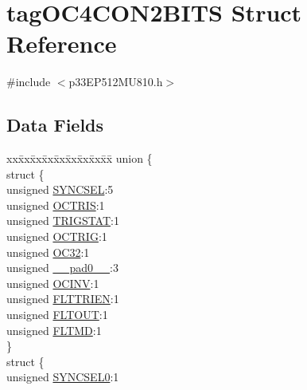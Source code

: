 \hypertarget{structtag_o_c4_c_o_n2_b_i_t_s}{}\section{tag\+O\+C4\+C\+O\+N2\+B\+I\+TS Struct Reference}
\label{structtag_o_c4_c_o_n2_b_i_t_s}


{\ttfamily \#include $<$p33\+E\+P512\+M\+U810.\+h$>$}

\subsection*{Data Fields}
\begin{DoxyCompactItemize}
\item 
\begin{tabbing}
xx\=xx\=xx\=xx\=xx\=xx\=xx\=xx\=xx\=\kill
union \{\\
\>struct \{\\
\>\>unsigned \hyperlink{structtag_o_c4_c_o_n2_b_i_t_s_a35fbbe11485c2615ed27535b62c3fa35}{SYNCSEL}:5\\
\>\>unsigned \hyperlink{structtag_o_c4_c_o_n2_b_i_t_s_ab849a74c6179282ed6b06cc047c80544}{OCTRIS}:1\\
\>\>unsigned \hyperlink{structtag_o_c4_c_o_n2_b_i_t_s_ab379549de54ac93ad4aa73686c34cb7c}{TRIGSTAT}:1\\
\>\>unsigned \hyperlink{structtag_o_c4_c_o_n2_b_i_t_s_a8d2cf9b996ef2b9079defa8950de798c}{OCTRIG}:1\\
\>\>unsigned \hyperlink{structtag_o_c4_c_o_n2_b_i_t_s_af52e127483a703e0fa84c7d4f1de0df4}{OC32}:1\\
\>\>unsigned \hyperlink{structtag_o_c4_c_o_n2_b_i_t_s_adf71f3d8410c1f1dbbc96680a92c49af}{\_\_pad0\_\_}:3\\
\>\>unsigned \hyperlink{structtag_o_c4_c_o_n2_b_i_t_s_a301004fca40c8d19d418866c92c19a06}{OCINV}:1\\
\>\>unsigned \hyperlink{structtag_o_c4_c_o_n2_b_i_t_s_ab979b75e02643aa840fb6ee50e0c30fa}{FLTTRIEN}:1\\
\>\>unsigned \hyperlink{structtag_o_c4_c_o_n2_b_i_t_s_ae466664b094d9c830e9ce20b86d7907f}{FLTOUT}:1\\
\>\>unsigned \hyperlink{structtag_o_c4_c_o_n2_b_i_t_s_a245ca3019d6c6ccbfb09f1c821146bb5}{FLTMD}:1\\
\>\} \\
\>struct \{\\
\>\>unsigned \hyperlink{structtag_o_c4_c_o_n2_b_i_t_s_a3b5df3154fde5141e6ac0156425ff8b4}{SYNCSEL0}:1\\

\end{tabbing}
\end{DoxyCompactItemize}
